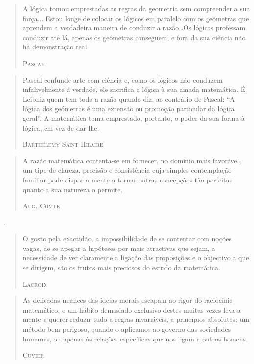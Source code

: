 \documentclass{hipatia}
\begin{document}
\begin{quote}
A lógica tomou emprestadas as regras da geometria sem compreender a sua força... Estou longe de colocar os lógicos em paralelo com os geômetras que aprendem a verdadeira maneira de conduzir a razão\dots  Os lógicos professam conduzir até lá, apenas os geômetras conseguem, e fora da sua ciência não há demonstração real.

\hfill \textsc{Pascal}
\end{quote}


\begin{quote}
Pascal confunde arte com ciência e, como os lógicos não conduzem infalivelmente à verdade, ele sacrifica a lógica à sua amada matemática. É Leibniz quem tem toda a razão quando diz, ao contrário de Pascal: ``A lógica dos geómetras é uma extensão ou promoção particular da lógica geral''. A matemática toma emprestado, portanto, o poder da sua forma à lógica, em vez de dar-lhe.

\hfill \textsc{Barthélemy Saint-Hilaire}
\end{quote}

 
\begin{quote}
A razão matemática contenta-se em fornecer, no domínio mais favorável, um tipo de clareza, precisão e consistência cuja simples contemplação familiar pode dispor a mente a tornar outras concepções tão perfeitas quanto a sua natureza o permite.

\hfill \textsc{Aug. Comte}
\end{quote}.


\begin{quote}
O gosto pela exactidão, a impossibilidade de se contentar com noções vagas, de se apegar a hipóteses por mais atractivas que sejam, a necessidade de ver claramente a ligação das proposições e o objectivo a que se dirigem, são os frutos mais preciosos do estudo da matemática.

\hfill \textsc{Lacroix}
\end{quote}
 
\begin{quote}
As delicadas nuances das ideias morais escapam ao rigor do raciocínio matemático, e um hábito demasiado exclusivo destes muitas vezes leva a mente a querer reduzir tudo a regras invariáveis, a princípios absolutos; um método bem perigoso, quando o aplicamos ao governo das sociedades humanas, ou apenas às relações específicas que nos ligam a outros homens.

\hfill \textsc{Cuvier}
\end{quote}
\end{document}
